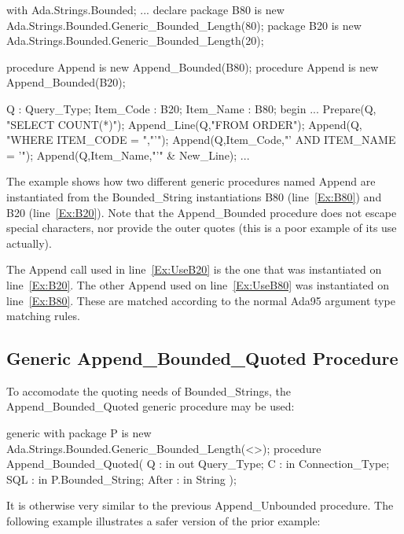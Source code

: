 \documentclass[english,letterpaper]{book}
\begin{document}
\begin{NumberedExample}
with Ada.Strings.Bounded;
...
declare
   package B80 
      is new Ada.Strings.Bounded.Generic_Bounded_Length(80);
   package B20 
      is new Ada.Strings.Bounded.Generic_Bounded_Length(20);

   procedure Append is new Append_Bounded(B80);\label{Ex:B80}
   procedure Append is new Append_Bounded(B20);\label{Ex:B20}

   Q :         Query_Type;
   Item_Code : B20;
   Item_Name : B80;
begin
   ...
   Prepare(Q,    "SELECT COUNT(*)");
   Append_Line(Q,"FROM ORDER");
   Append(Q,     "WHERE ITEM_CODE = ","'");
   Append(Q,Item_Code,"' AND ITEM_NAME = '");\label{Ex:UseB20}
   Append(Q,Item_Name,"'" & New_Line);\label{Ex:UseB80}
   ...
\end{NumberedExample}

The example shows how two different generic procedures named Append
are instantiated from the Bounded\_String instantiations B80 (line~\ref{Ex:B80})
and B20 (line~\ref{Ex:B20}). Note that the Append\_Bounded procedure does not escape
special characters, nor provide the outer quotes (this is a poor example of its
use actually).

The Append call used in line~\ref{Ex:UseB20} is the one that was
instantiated on line~\ref{Ex:B20}. The other Append used on
line~\ref{Ex:UseB80} was instantiated on line~\ref{Ex:B80}. These
are matched according to the normal Ada95 argument type matching
rules.

\subsection{Generic Append\_Bounded\_Quoted Procedure}

To accomodate the quoting needs of Bounded\_Strings, the Append\_Bounded\_Quoted
generic procedure may be used:

\begin{Code}
generic
   with package P
      is new Ada.Strings.Bounded.Generic_Bounded_Length(<>);
procedure Append_Bounded_Quoted(
   Q :     in out Query_Type;
   C :     in     Connection_Type;
   SQL :   in     P.Bounded_String;
   After : in     String
);
\end{Code}

It is otherwise very similar to the previous Append\_Unbounded procedure.
The following example illustrates a safer version of the prior example:
\end{document}
